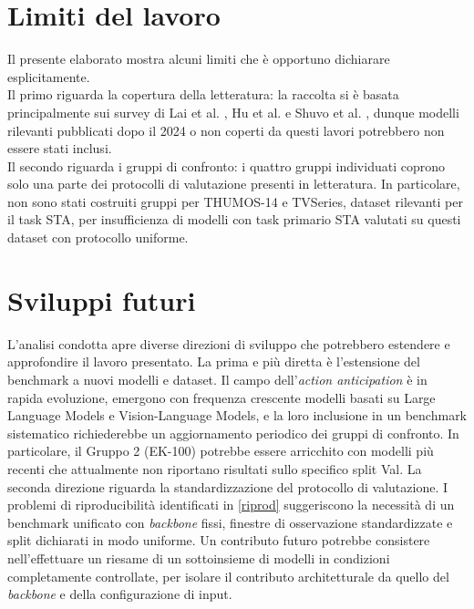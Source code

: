 \section{Limiti del lavoro}
Il presente elaborato mostra alcuni limiti che è opportuno dichiarare esplicitamente. \\
Il primo riguarda la copertura della letteratura: la raccolta si è basata principalmente sui survey di Lai et al. \cite{lai2024human}, Hu et al.\cite{hu2022online} e Shuvo et al. \cite{shuvo2025deep}, dunque modelli rilevanti pubblicati dopo il 2024 o non coperti da questi lavori potrebbero non essere stati inclusi.\\
Il secondo riguarda i gruppi di confronto: i quattro gruppi individuati coprono solo una parte dei protocolli di valutazione presenti in letteratura. In particolare, non sono stati costruiti gruppi per THUMOS-14 e TVSeries, dataset rilevanti per il task STA, per insufficienza di modelli con task primario STA valutati su questi dataset con protocollo uniforme.

\section{Sviluppi futuri}
L'analisi condotta apre diverse direzioni di sviluppo che potrebbero estendere e approfondire il lavoro presentato.
La prima e più diretta è l'estensione del benchmark a nuovi modelli e dataset. Il campo dell'\textit{action anticipation} è in rapida evoluzione, emergono con frequenza crescente modelli basati su Large Language Models e Vision-Language Models, e la loro inclusione in un benchmark sistematico richiederebbe un aggiornamento periodico dei gruppi di confronto. In particolare, il Gruppo 2 (EK-100) potrebbe essere arricchito con modelli più recenti che attualmente non riportano risultati sullo specifico split Val.
La seconda direzione riguarda la standardizzazione del protocollo di valutazione. I problemi di riproducibilità identificati in \ref{riprod} suggeriscono la necessità di un benchmark unificato con \textit{backbone} fissi, finestre di osservazione standardizzate e split dichiarati in modo uniforme. Un contributo futuro potrebbe consistere nell'effettuare un riesame di un sottoinsieme di modelli in condizioni completamente controllate, per isolare il contributo architetturale da quello del \textit{backbone} e della configurazione di input.





